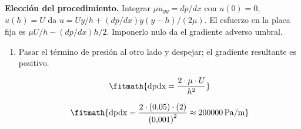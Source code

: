 \noindent\textbf{Elección del procedimiento.} Integrar $\mu u_{yy}=dp/dx$ con $u(0)=0$, $u(h)=U$ da $u=Uy/h+(dp/dx)y(y-h)/(2\mu)$. El esfuerzo en la placa fija es $\mu U/h-(dp/dx)h/2$. Imponerlo nulo da el gradiente adverso umbral.

\begin{enumerate}

\item Pasar el término de presión al otro lado y despejar; el gradiente resultante es positivo.

\[\fitmath{\mathrm{dpdx}=\frac{2\cdot \mu\cdot U}{{h}^{2}}}\]

\[\fitmath{\mathrm{dpdx}=\frac{2\cdot (0{,}05)\cdot (2)}{{(0{,}001)}^{2}}\approx 200000\,\mathrm{Pa/m}}\]

\end{enumerate}
